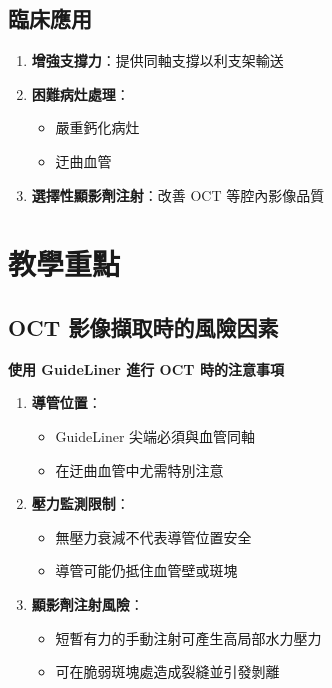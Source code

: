\documentclass[12pt,a4paper]{article}
\begin{document}
\subsection{臨床應用}

\begin{enumerate}
    \item \textbf{增強支撐力}：提供同軸支撐以利支架輸送
    \item \textbf{困難病灶處理}：
    \begin{itemize}
        \item 嚴重鈣化病灶
        \item 迂曲血管
    \end{itemize}
    \item \textbf{選擇性顯影劑注射}：改善 OCT 等腔內影像品質
\end{enumerate}

\section{教學重點}

\subsection{OCT 影像擷取時的風險因素}

\begin{importantbox}
\textbf{使用 GuideLiner 進行 OCT 時的注意事項}

\begin{enumerate}
    \item \textbf{導管位置}：
    \begin{itemize}
        \item GuideLiner 尖端必須與血管同軸
        \item 在迂曲血管中尤需特別注意
    \end{itemize}

    \item \textbf{壓力監測限制}：
    \begin{itemize}
        \item 無壓力衰減不代表導管位置安全
        \item 導管可能仍抵住血管壁或斑塊
    \end{itemize}

    \item \textbf{顯影劑注射風險}：
    \begin{itemize}
        \item 短暫有力的手動注射可產生高局部水力壓力
        \item 可在脆弱斑塊處造成裂縫並引發剝離
    \end{itemize}
\end{enumerate}
\end{importantbox}
\end{document}
